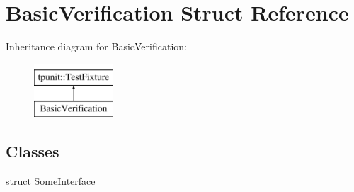 \hypertarget{structBasicVerification}{}\section{Basic\+Verification Struct Reference}
\label{structBasicVerification}
Inheritance diagram for Basic\+Verification\+:\begin{figure}[H]
\begin{center}
\leavevmode
\includegraphics[height=2.000000cm]{structBasicVerification}
\end{center}
\end{figure}
\subsection*{Classes}
\begin{DoxyCompactItemize}
\item 
struct \mbox{\hyperlink{structBasicVerification_1_1SomeInterface}{Some\+Interface}}
\end{DoxyCompactItemize}
